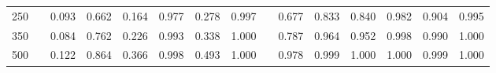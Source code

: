 % 
\begin{tabular}{ccccccccccccccc}
  \hline
  \hline
250 &  & 0.093 & 0.662 & 0.164 & 0.977 & 0.278 & 0.997 &  & 0.677 & 0.833 & 0.840 & 0.982 & 0.904 & 0.995 \\ 
  350 &  & 0.084 & 0.762 & 0.226 & 0.993 & 0.338 & 1.000 &  & 0.787 & 0.964 & 0.952 & 0.998 & 0.990 & 1.000 \\ 
  500 &  & 0.122 & 0.864 & 0.366 & 0.998 & 0.493 & 1.000 &  & 0.978 & 0.999 & 1.000 & 1.000 & 0.999 & 1.000 \\ 
   \hline
\end{tabular}
